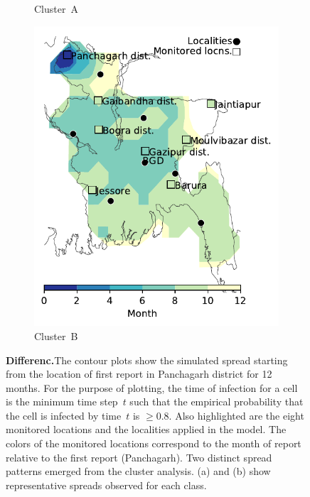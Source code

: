 \documentclass{article}
\begin{document}
\begin{figure}[!t]
\begin{subfigure}[b]{.32\textwidth}
    \caption{Cluster~A \label{fig:bgdClassA}}
\end{subfigure}\hspace{.25cm}
\begin{subfigure}[b]{.32\textwidth}
    \includegraphics[width=\textwidth]{../cellular_automata/results/contour/BGD_model-B_m1_l3.pdf}
    \caption{Cluster~B \label{fig:bgdClassB1}}
\end{subfigure}
\caption{\textbf{Differenc.}The contour plots show the simulated
spread starting from the location of first report in Panchagarh district
for 12 months. For the purpose of plotting, the time of infection for a
cell is the minimum time step~$t$ such that the empirical probability that
the cell is infected by time~$t$ is $\ge0.8$. Also highlighted are the
eight monitored locations and the localities applied in the model. The
colors of the monitored locations correspond to the month of report
relative to the first report (Panchagarh). Two distinct spread patterns
emerged from the cluster analysis. (a) and (b) show representative spreads
observed for each class.}
\end{figure}
\end{document}
